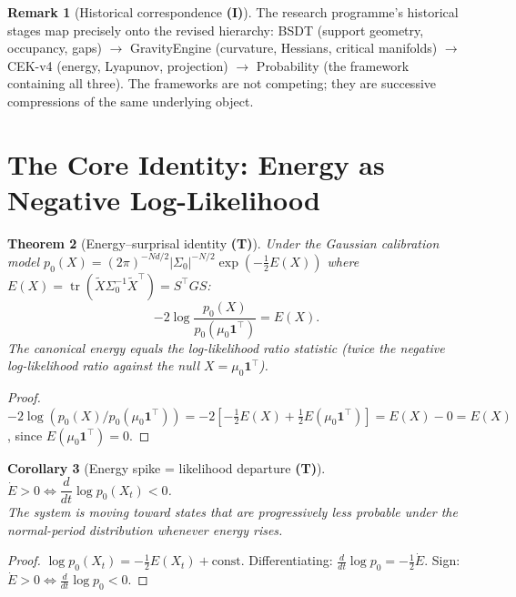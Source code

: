 \documentclass[11pt,a4paper]{article}
\newtheorem{theorem}{Theorem}[section]
\newtheorem{corollary}[theorem]{Corollary}
\theoremstyle{definition}
\newtheorem{remark}[theorem]{Remark}
\begin{document}
\begin{remark}[Historical correspondence \textbf{(I)}]
The research programme's historical stages map precisely onto the revised hierarchy:
BSDT (support geometry, occupancy, gaps) $\to$
GravityEngine (curvature, Hessians, critical manifolds) $\to$
CEK-v4 (energy, Lyapunov, projection) $\to$
Probability (the framework containing all three).
The frameworks are not competing; they are successive compressions of the same underlying object.
\end{remark}

\section{The Core Identity: Energy as Negative Log-Likelihood}
\label{sec:core_identity}

\begin{theorem}[Energy--surprisal identity \textbf{(T)}]
\label{thm:surprisal}
Under the Gaussian calibration model
$p_0(X) = (2\pi)^{-Nd/2}|\Sigma_0|^{-N/2}\exp(-\tfrac{1}{2}E(X))$
where $E(X) = \operatorname{tr}(\tilde X\Sigma_0^{-1}\tilde X^\top) = S^\top GS$:
\[
-2\log\frac{p_0(X)}{p_0(\mu_0\mathbf{1}^\top)} = E(X).
\]
The canonical energy equals the log-likelihood ratio statistic (twice the negative log-likelihood ratio against the null $X = \mu_0\mathbf{1}^\top$).
\end{theorem}

\begin{proof}
$-2\log(p_0(X)/p_0(\mu_0\mathbf{1}^\top))
= -2[-\tfrac{1}{2}E(X) + \tfrac{1}{2}E(\mu_0\mathbf{1}^\top)]
= E(X) - 0 = E(X)$,
since $E(\mu_0\mathbf{1}^\top) = 0$.
\end{proof}

\begin{corollary}[Energy spike = likelihood departure \textbf{(T)}]
$\dot E > 0 \iff \dfrac{d}{dt}\log p_0(X_t) < 0$.\\
The system is moving toward states that are progressively less probable under the
normal-period distribution whenever energy rises.
\end{corollary}

\begin{proof}
$\log p_0(X_t) = -\tfrac{1}{2}E(X_t) + \mathrm{const}$.
Differentiating: $\tfrac{d}{dt}\log p_0 = -\tfrac{1}{2}\dot E$.
Sign: $\dot E > 0 \iff \tfrac{d}{dt}\log p_0 < 0$.
\end{proof}
\end{document}
